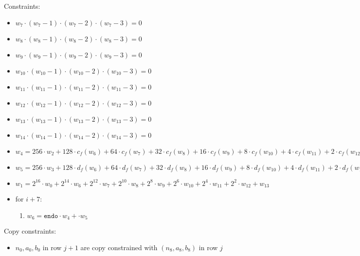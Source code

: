 Constraints:
\begin{itemize}
    \item $w_{7} \cdot (w_{7} - 1) \cdot (w_{7} - 2)\cdot (w_{7} - 3)  = 0$
    \item $w_{8} \cdot (w_{8} - 1) \cdot (w_{8} - 2)\cdot (w_{8} - 3)  = 0$
    \item $w_{9} \cdot (w_{9} - 1) \cdot (w_{9} - 2)\cdot (w_{9} - 3)  = 0$
    \item $w_{10} \cdot (w_{10} - 1) \cdot (w_{10} - 2)\cdot (w_{10} - 3)  = 0$
    \item $w_{11} \cdot (w_{11} - 1) \cdot (w_{11} - 2)\cdot (w_{11} - 3)  = 0$
    \item $w_{12} \cdot (w_{12} - 1) \cdot (w_{12} - 2)\cdot (w_{12} - 3)  = 0$
    \item $w_{13} \cdot (w_{13} - 1) \cdot (w_{13} - 2)\cdot (w_{13} - 3)  = 0$
    \item $w_{14} \cdot (w_{14} - 1) \cdot (w_{14} - 2)\cdot (w_{14} - 3)  = 0$
    \item $w_{4} = 256 \cdot w_{2} + 128 \cdot c_f(w_6) + 64 \cdot c_f(w_7) + 32 \cdot c_f(w_8) + 16 \cdot c_f(w_9) + 8 \cdot c_f(w_{10}) + 4 \cdot c_f(w_{11}) + 2 \cdot c_f(w_{12}) + c_f(w_{13})$
    \item $w_{5} = 256 \cdot w_{3} + 128 \cdot d_f(w_6) + 64 \cdot d_f(w_7) + 32 \cdot d_f(w_8) + 16 \cdot d_f(w_9) + 8 \cdot d_f(w_{10}) + 4 \cdot d_f(w_{11}) + 2 \cdot d_f(w_{12}) + d_f(w_{13})$
    \item $w_{1} = 2^{16} \cdot w_{0} + 2^{14} \cdot w_6 + 2^{12} \cdot w_7 + 2^{10} \cdot w_8 + 2^8 \cdot w_9 + 2^6 \cdot w_{10} + 2^4 \cdot w_{11} + 2^2 \cdot w_{12} + w_{13}$
	\item for $i + 7$:
	\begin{enumerate}
		\item $w_{6} = \texttt{endo} \cdot w_{4} +  \cdot w_{5}$
	\end{enumerate}
\end{itemize}

    Copy constraints:
    \begin{itemize}
    \item $n_0, a_0, b_0$ in row $j + 1$ are copy constrained with $(n_8, a_8, b_8)$ in row $j$ 
    \end{itemize}